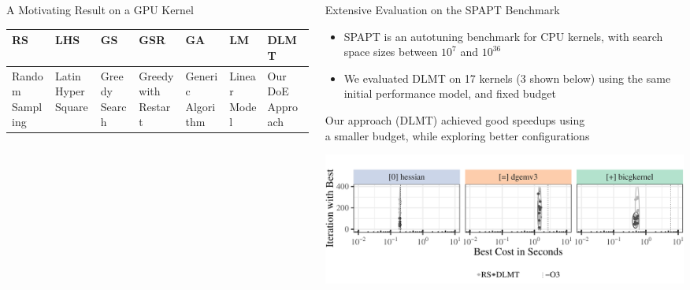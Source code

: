 \documentclass[11pt, compress, aspectratio=169, xcolor={table,usenames,dvipsnames}]{beamer}
\begin{document}
\begin{frame}
\begin{columns}
\begin{column}{0.86\columnwidth}
\begin{columns}
\begin{column}[t]{0.5\columnwidth}
\begin{block}{A Motivating Result on a GPU Kernel}
\begin{table}[htbp]
\centering
\tiny
\begin{tabular}{p{}p{}p{}p{}p{}p{}p{}}
\toprule
RS & LHS & GS & GSR & GA & LM & DLMT\\
\midrule
Random Sampling & Latin Hyper Square & Greedy Search & Greedy with Restart & Generic Algorithm & Linear Model & Our DoE Approach\\
\bottomrule
\end{tabular}
\end{table}
\end{block}
\end{column}
\begin{column}[t]{0.5\columnwidth}
\begin{block}{ \vphantom{g}Extensive Evaluation on the SPAPT Benchmark}
\begin{itemize}
\item \alert{SPAPT} is an \alert{autotuning benchmark} for \alert{CPU kernels}, with \alert{search space sizes}
between \alert{\(10^7\) and \(10^{36}\)}
\item We evaluated \alert{DLMT} on \alert{17 kernels} (\alert{3} shown below)
using \alert{the same initial performance model}, and \alert{fixed budget}
\end{itemize}

\vspace{0.3em}
\begin{center}
{\small
Our approach (\alert{DLMT}) achieved \alert{good speedups} using
      \\[0.3em] a \alert{smaller budget}, while \alert{exploring better
configurations}
}
\end{center}
\begin{center}
\begin{center}
\includegraphics[width=0.85\columnwidth]{../../../img/iteration_best_comparison.pdf}
\end{center}
\end{center}


\end{block}
\end{column}
\end{columns}
\end{column}
\end{columns}
\end{frame}
\end{document}
